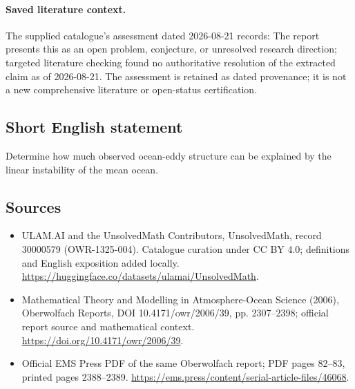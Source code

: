 \documentclass[11pt]{article}
\begin{document}
\paragraph{Saved literature context.} The supplied catalogue's assessment dated 2026-08-21 records: The report presents this as an open problem, conjecture, or unresolved research direction; targeted literature checking found no authoritative resolution of the extracted claim as of 2026-08-21. The assessment is retained as dated provenance; it is not a new comprehensive literature or open-status certification.
\subsection{Short English statement}
Determine how much observed ocean-eddy structure can be explained by the linear instability of the mean ocean.
\subsection{Sources}
\begin{itemize}
\item[\hypertarget{source:30000579:1}{S1}] ULAM.AI and the UnsolvedMath Contributors, UnsolvedMath, record 30000579 (OWR-1325-004). Catalogue curation under CC BY 4.0; definitions and English exposition added locally.
\url{https://huggingface.co/datasets/ulamai/UnsolvedMath}.
\item[\hypertarget{source:30000579:2}{S2}] Mathematical Theory and Modelling in Atmosphere-Ocean Science (2006), Oberwolfach Reports, DOI 10.4171/owr/2006/39, pp. 2307--2398; official report source and mathematical context.
\url{https://doi.org/10.4171/owr/2006/39}.
\item[\hypertarget{source:30000579:3}{S3}] Official EMS Press PDF of the same Oberwolfach report; PDF pages 82--83, printed pages 2388--2389.
\url{https://ems.press/content/serial-article-files/46068}.
\end{itemize}
\label{end:30000579}
\end{document}
